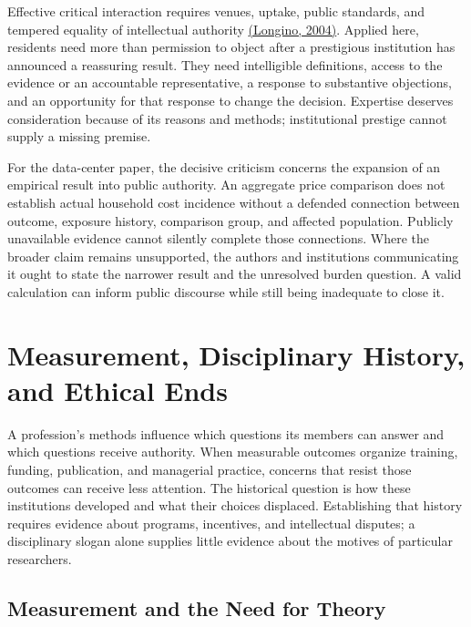 Effective critical interaction requires venues, uptake, public
standards, and tempered equality of intellectual authority
\href{https://www.ugr.es/~zink/mono/Longino2004.pdf}{(Longino, 2004)}.
Applied here, residents need more than permission to object after a
prestigious institution has announced a reassuring result. They need
intelligible definitions, access to the evidence or an accountable
representative, a response to substantive objections, and an opportunity
for that response to change the decision. Expertise deserves
consideration because of its reasons and methods; institutional prestige
cannot supply a missing premise.

For the data-center paper, the decisive criticism concerns the expansion
of an empirical result into public authority. An aggregate price
comparison does not establish actual household cost incidence without a
defended connection between outcome, exposure history, comparison group,
and affected population. Publicly unavailable evidence cannot silently
complete those connections. Where the broader claim remains unsupported,
the authors and institutions communicating it ought to state the
narrower result and the unresolved burden question. A valid calculation
can inform public discourse while still being inadequate to close it.


\hypertarget{M09-measurement-disciplinary-history-and-ethical-ends}{%
\section{Measurement, Disciplinary History, and Ethical
Ends}\label{M09-measurement-disciplinary-history-and-ethical-ends}}

\noindent A profession's methods influence which questions its members can answer
and which questions receive authority. When measurable outcomes organize
training, funding, publication, and managerial practice, concerns that
resist those outcomes can receive less attention. The historical
question is how these institutions developed and what their choices
displaced. Establishing that history requires evidence about programs,
incentives, and intellectual disputes; a disciplinary slogan alone
supplies little evidence about the motives of particular researchers.

\hypertarget{M09-measurement-and-the-need-for-theory}{%
\subsection{Measurement and the Need for
Theory}\label{M09-measurement-and-the-need-for-theory}}

